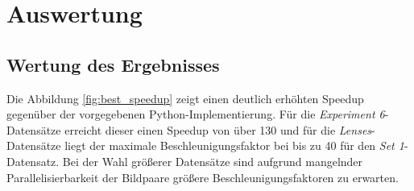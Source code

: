 \chapter{Auswertung}

\section{Wertung des Ergebnisses}

Die Abbildung \ref{fig:best_speedup} zeigt einen deutlich erhöhten Speedup gegenüber der vorgegebenen Python-Implementierung. Für die \textit{Experiment 6}-Datensätze erreicht dieser einen Speedup von über 130 und für die \textit{Lenses}-Datensätze liegt der maximale Beschleunigungsfaktor bei bis zu 40 für den \textit{Set 1}-Datensatz. Bei der Wahl größerer Datensätze sind aufgrund mangelnder Parallelisierbarkeit der Bildpaare größere Beschleunigungsfaktoren zu erwarten.

